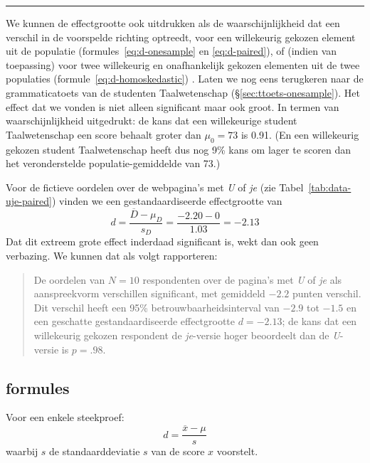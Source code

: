 \documentclass[
]{book}
\begin{document}
\begin{center}\rule{0.5\linewidth}{0.5pt}\end{center}

We kunnen de effectgrootte ook uitdrukken als de waarschijnlijkheid dat
een verschil in de voorspelde richting optreedt, voor een willekeurig
gekozen element uit de populatie
(formules~\eqref{eq:d-onesample} en \eqref{eq:d-paired}),
of (indien van toepassing) voor twee
willekeurig en onafhankelijk gekozen elementen uit de twee populaties
(formule~\eqref{eq:d-homoskedastic}) \citep{McGraw92}. Laten we nog eens
terugkeren naar de grammaticatoets van de studenten Taalwetenschap
(§\ref{sec:ttoets-onesample}). Het effect dat we vonden is niet
alleen significant maar ook groot. In termen van waarschijnlijkheid
uitgedrukt: de kans dat een willekeurige student Taalwetenschap een
score behaalt groter dan \(\mu_0=73\) is 0.91. (En een willekeurig gekozen
student Taalwetenschap heeft dus nog 9\% kans om lager te scoren dan het
veronderstelde populatie-gemiddelde van 73.)

Voor de fictieve oordelen over de webpagina's met \emph{U} of \emph{je} (zie
Tabel~\ref{tab:data-uje-paired}) vinden we een gestandaardiseerde
effectgrootte van
\[d = \frac{ \overline{D}-\mu_D} {s_D} = \frac{ -2.20-0 } {1.03} = -2.13\]
Dat dit extreem grote effect inderdaad significant is, wekt dan ook geen
verbazing. We kunnen dat als volgt rapporteren:

\begin{quote}
De oordelen van \(N=10\) respondenten over de pagina's met \emph{U} of \emph{je}
als aanspreekvorm verschillen significant, met gemiddeld \(-2.2\) punten
verschil. Dit verschil heeft een 95\% betrouwbaarheidsinterval van
\(-2.9\) tot \(-1.5\) en een geschatte gestandaardiseerde effectgrootte
\(d=-2.13\); de kans dat een willekeurig gekozen respondent de
\emph{je}-versie hoger beoordeelt dan de \emph{U}-versie is \(p=.98\).
\end{quote}

\hypertarget{sec:formules13-5}{%
\subsection{formules}\label{sec:formules13-5}}

Voor een enkele steekproef:
\begin{equation}
   \label{eq:d-onesample}
  d = \frac{\overline{x}-\mu}{s}
\end{equation}
waarbij \(s\) de standaarddeviatie \(s\)
van de score \(x\) voorstelt.
\end{document}
